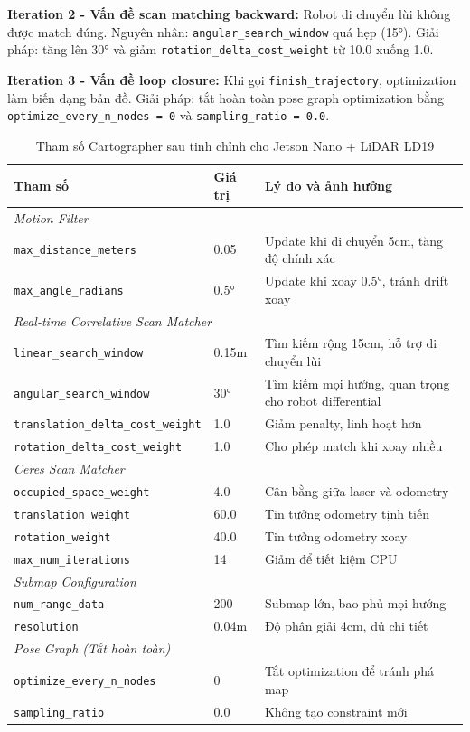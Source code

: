 \textbf{Iteration 2 - Vấn đề scan matching backward:} Robot di chuyển lùi không được match đúng. Nguyên nhân: \texttt{angular\_search\_window} quá hẹp (15°). Giải pháp: tăng lên 30° và giảm \texttt{rotation\_delta\_cost\_weight} từ 10.0 xuống 1.0.

\textbf{Iteration 3 - Vấn đề loop closure:} Khi gọi \texttt{finish\_trajectory}, optimization làm biến dạng bản đồ. Giải pháp: tắt hoàn toàn pose graph optimization bằng \texttt{optimize\_every\_n\_nodes = 0} và \texttt{sampling\_ratio = 0.0}.

\begin{table}[H]
\centering
\caption{Tham số Cartographer sau tinh chỉnh cho Jetson Nano + LiDAR LD19}
\label{tab:carto_params}
\begin{tabular}{p{5.5cm}p{2cm}p{6cm}}
\hline
\textbf{Tham số} & \textbf{Giá trị} & \textbf{Lý do và ảnh hưởng} \\
\hline
\multicolumn{3}{l}{\textit{Motion Filter}} \\
\texttt{max\_distance\_meters} & 0.05 & Update khi di chuyển 5cm, tăng độ chính xác \\
\texttt{max\_angle\_radians} & 0.5° & Update khi xoay 0.5°, tránh drift xoay \\
\hline
\multicolumn{3}{l}{\textit{Real-time Correlative Scan Matcher}} \\
\texttt{linear\_search\_window} & 0.15m & Tìm kiếm rộng 15cm, hỗ trợ di chuyển lùi \\
\texttt{angular\_search\_window} & 30° & Tìm kiếm mọi hướng, quan trọng cho robot differential \\
\texttt{translation\_delta\_cost\_weight} & 1.0 & Giảm penalty, linh hoạt hơn \\
\texttt{rotation\_delta\_cost\_weight} & 1.0 & Cho phép match khi xoay nhiều \\
\hline
\multicolumn{3}{l}{\textit{Ceres Scan Matcher}} \\
\texttt{occupied\_space\_weight} & 4.0 & Cân bằng giữa laser và odometry \\
\texttt{translation\_weight} & 60.0 & Tin tưởng odometry tịnh tiến \\
\texttt{rotation\_weight} & 40.0 & Tin tưởng odometry xoay \\
\texttt{max\_num\_iterations} & 14 & Giảm để tiết kiệm CPU \\
\hline
\multicolumn{3}{l}{\textit{Submap Configuration}} \\
\texttt{num\_range\_data} & 200 & Submap lớn, bao phủ mọi hướng \\
\texttt{resolution} & 0.04m & Độ phân giải 4cm, đủ chi tiết \\
\hline
\multicolumn{3}{l}{\textit{Pose Graph (Tắt hoàn toàn)}} \\
\texttt{optimize\_every\_n\_nodes} & 0 & Tắt optimization để tránh phá map \\
\texttt{sampling\_ratio} & 0.0 & Không tạo constraint mới \\
\hline
\end{tabular}
\end{table}


